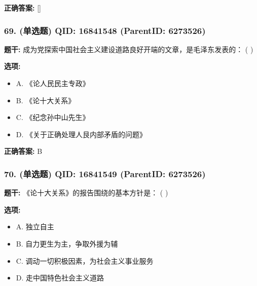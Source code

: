 \documentclass[12pt,UTF8]{ctexart}
\begin{document}
\textbf{正确答案:}
[]

\vspace{0.3em}\hrulefill\vspace{0.7em}

\subsubsection*{69. (单选题) \small QID: 16841548 (ParentID: 6273526)}

\textbf{题干:}
成为党探索中国社会主义建设道路良好开端的文章，是毛泽东发表的： ( )



\textbf{选项:}
\begin{itemize}[leftmargin=*]

  \item A. 《论人民民主专政》

  \item B. 《论十大关系》

  \item C. 《纪念孙中山先生》

  \item D. 《关于正确处理人艮内部矛盾的问题》

\end{itemize}

\textbf{正确答案:}
B

\vspace{0.3em}\hrulefill\vspace{0.7em}

\subsubsection*{70. (单选题) \small QID: 16841549 (ParentID: 6273526)}

\textbf{题干:}
《论十大关系》的报告围绕的基本方针是： ( )



\textbf{选项:}
\begin{itemize}[leftmargin=*]

  \item A. 独立自主

  \item B. 自力更生为主，争取外援为辅

  \item C. 调动一切积极因素，为社会主义事业服务

  \item D. 走中国特色社会主义道路

\end{itemize}
\end{document}
